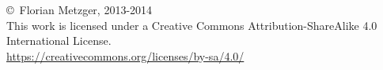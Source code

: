 \newpage
\thispagestyle{empty}
\null
\vfill
\begin{center}
\copyright~Florian Metzger, 2013-2014\\
This work is licensed under a Creative Commons Attribution-ShareAlike 4.0 International License.\\
\url{https://creativecommons.org/licenses/by-sa/4.0/}
\vskip 0.5cm
\ccbysa
\end{center}
